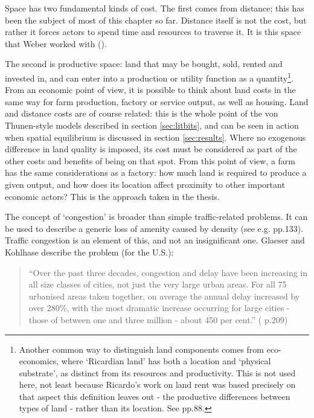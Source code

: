 {Space has two fundamental kinds of cost. The first comes from distance; this has been the subject of most of this chapter so far.  Distance itself is not the cost, but rather it forces actors to spend time and resources to traverse it. It is this space that Weber worked with (\citealt{ weber_theory_1909}).

The second is productive space: land that may be bought, sold, rented and invested in, and can enter into a production or utility function as a quantity\footnote{Another common way to distinguish land components comes from eco-economics, where `Ricardian land' has both a location and `physical substrate', as distinct from its resources and productivity. This is not used here, not least because Ricardo's work on land rent was based precisely on that aspect this definition leaves out - the productive differences between types of land - rather than its location. See \citealt{daly_ecological_2003} pp.88.}. From an economic point of view, it is possible to think about land costs in the same way for farm production, factory or service output, as well as housing. Land and distance costs are of course related: this is the whole point of the von Thunen-style models described in section \ref{sec:litbits}, and can be seen in action when spatial equilibrium is discussed in section \ref{sec:results}. Where no exogenous difference in land quality is imposed, its cost must be considered as part of the other costs and benefits of being on that spot. From this point of view, a farm has the same considerations as a factory: how much land is required to produce a given output, and how does its location affect proximity to other important economic actors? This is the approach taken in the thesis.

The concept of `congestion' is broader than simple traffic-related problems. It can be used to describe a generic loss of amenity caused by density (see e.g. \citealt{glaeser_cities_2008} pp.133). Traffic congestion is an element of this, and not an insignificant one. Glaeser and Kohlhase describe the problem (for the U.S.): 

\begin{quote}
``Over the past three decades, congestion and delay have been increasing in all size classes of cities, not just the very large urban areas.  For all 75 urbanised areas taken together, on average the annual delay increased by over 280\%, with the most dramatic increase occurring for large cities - those of between one and three million - about 450 per cent.'' (\citealt{glaeser_cities_2004} p.209)
\end{quote}

}
